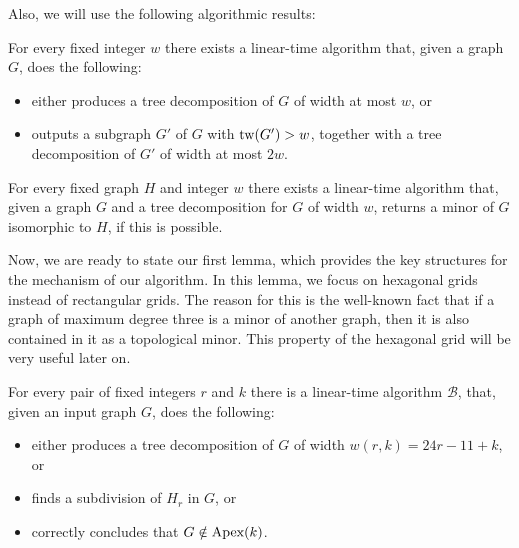 \documentclass{llncs}
\begin{document}
Also, we will use the following algorithmic results:

\begin{theorem}
\label{thm_treedecomp}
For every fixed integer $w$ there exists a linear-time algorithm that, given a graph $G$, does the following:
\begin{itemize}
\item either produces a tree decomposition of $G$ of width at most $w$, or
\item outputs a subgraph $G'$ of $G$ with $\textup{tw}(G')>w$,
together with a tree decomposition of $G'$ of width at most $2w$.
\end{itemize}
\end{theorem}

\begin{theorem}
\label{thm_minortest}
For every fixed graph $H$ and integer $w$ there exists a linear-time algorithm that, given a graph $G$
and a tree decomposition for $G$ of width $w$, returns a minor of $G$ isomorphic to $H$, if this is possible.
\end{theorem}

Now, we are ready to state our first lemma, which provides the key structures for the mechanism of our algorithm.
In this lemma, we focus on hexagonal grids instead of rectangular grids.
The reason for this is the well-known fact that if a graph of maximum degree three is a minor of another graph,
then it is also contained in it as a topological minor.
This property of the hexagonal grid will be very useful later on.

\begin{lemma}
\label{alg_b}
For every pair of fixed integers $r$ and $k$ there is a linear-time algorithm $\mathcal{B}$,
that, given an input graph $G$, does the following:
\begin{itemize}
\item
either produces a tree decomposition of $G$ of width $w(r,k)=24r-11+k$, or
\item
finds a subdivision of $H_r$ in $G$, or
\item
correctly concludes that $G \notin \textup{Apex}(k)$.
\end{itemize}
\end{lemma}
\end{document}
